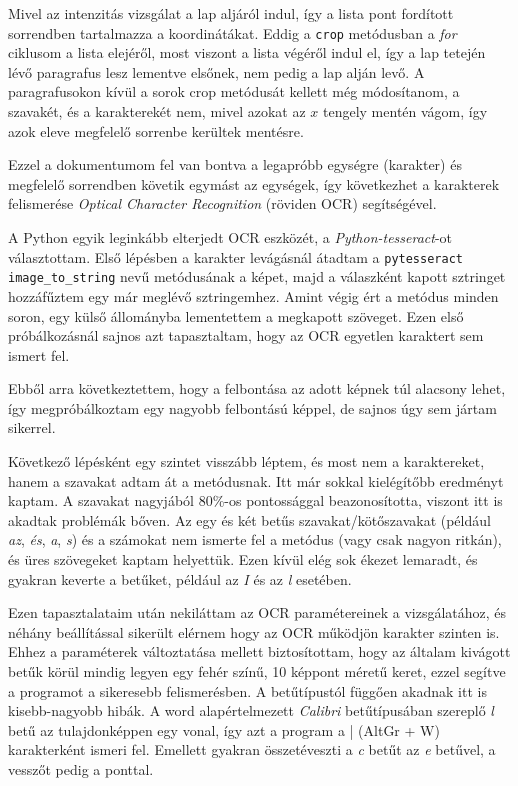 Mivel az intenzitás vizsgálat a lap aljáról indul, így a lista pont fordított sorrendben tartalmazza a koordinátákat. Eddig a \texttt{crop} metódusban a \textit{for} ciklusom a lista elejéről, most viszont a lista végéről indul el, így a lap tetején lévő paragrafus lesz lementve elsőnek, nem pedig a lap alján levő. A paragrafusokon kívül a sorok crop metódusát kellett még módosítanom, a szavakét, és a karakterekét nem, mivel azokat az $x$ tengely mentén vágom, így azok eleve megfelelő sorrenbe kerültek mentésre.

Ezzel a dokumentumom fel van bontva a legapróbb egységre (karakter) és megfelelő sorrendben követik egymást az egységek, így következhet a karakterek felismerése \textit{Optical Character Recognition} (röviden OCR) segítségével.


A Python egyik leginkább elterjedt OCR eszközét, a \textit{Python-tesseract}-ot választottam.
Első lépésben a karakter levágásnál átadtam a \texttt{pytesseract} \texttt{image\_to\_string} nevű metódusának a képet, majd a válaszként kapott sztringet hozzáfűztem egy már meglévő sztringemhez. Amint végig ért a metódus minden soron, egy külső állományba lementettem a megkapott szöveget. Ezen első próbálkozásnál sajnos azt tapasztaltam, hogy az OCR egyetlen karaktert sem ismert fel.

Ebből arra következtettem, hogy a felbontása az adott képnek túl alacsony lehet, így megpróbálkoztam egy nagyobb felbontású képpel, de sajnos úgy sem jártam sikerrel.

Következő lépésként egy szintet visszább léptem, és most nem a karaktereket, hanem a szavakat adtam át a metódusnak. Itt már sokkal kielégítőbb eredményt kaptam. A szavakat nagyjából 80\%-os pontossággal beazonosította, viszont itt is akadtak problémák bőven. Az egy és két betűs szavakat/kötőszavakat (például \emph{az}, \emph{és}, \emph{a}, \emph{s}) és a számokat nem ismerte fel a metódus (vagy csak nagyon ritkán), és üres szövegeket kaptam helyettük. Ezen kívül elég sok ékezet lemaradt, és gyakran keverte a betűket, például az \emph{I} és az \emph{l} esetében.

Ezen tapasztalataim után nekiláttam az OCR paramétereinek a vizsgálatához, és néhány beállítással sikerült elérnem hogy az OCR működjön karakter szinten is. Ehhez a paraméterek változtatása mellett biztosítottam, hogy az általam kivágott betűk körül mindig legyen egy fehér színű, 10 képpont méretű keret, ezzel segítve a programot a sikeresebb felismerésben. A betűtípustól függően akadnak itt is kisebb-nagyobb hibák. A word alapértelmezett \textit{Calibri} betűtípusában szereplő \emph{l} betű az tulajdonképpen egy vonal, így azt a program a | (AltGr + W) karakterként ismeri fel. Emellett gyakran összetéveszti a \emph{c} betűt az \emph{e} betűvel, a vesszőt pedig a ponttal.

